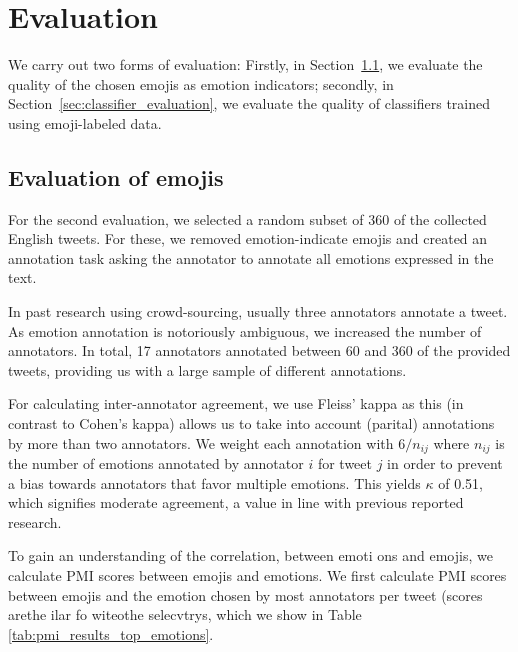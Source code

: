 \documentclass[10pt, a4paper]{article}
\begin{document}
\section{Evaluation}
\label{sec:evaluation}
We carry out two forms of evaluation: Firstly, 
in Section~\ref{sec:emoji_evaluation}, we evaluate the quality of the chosen emojis as emotion indicators; secondly, 
in Section~\ref{sec:classifier_evaluation}, we evaluate the quality of classifiers trained using emoji-labeled data.

\subsection{Evaluation of emojis}
\label{sec:emoji_evaluation}

For the second evaluation, we selected a random subset of 360 of the collected English tweets. For these, we removed emotion-indicate emojis and created an annotation task asking the annotator to annotate all emotions expressed in the text.

In past research using crowd-sourcing, usually three annotators annotate a tweet. As emotion annotation is notoriously ambiguous, we increased the number of annotators. In total, 17 annotators annotated between 60 and 360 of the provided tweets, providing us with a large sample of different annotations.

For calculating inter-annotator agreement, we use Fleiss' kappa as this (in contrast to Cohen's kappa) allows us to take into account (parital) annotations by more than two annotators. We weight each annotation with $ 6 / n_{ij}$ where $n_{ij}$ is the number of emotions annotated by annotator $i$ for tweet $j$ in order to prevent a bias towards annotators that favor multiple emotions. This yields $\kappa$ of 0.51, which signifies moderate agreement, a value in line with previous reported research.

To gain an understanding of the correlation, between emoti%
%
%
ons and emojis, we calculate PMI scores between emojis and emotions. We first calculate PMI scores between emojis and the emotion chosen by most annotators per tweet (scores arethe ilar fo witeothe selecvtrys, which we show in Table \ref{tab:pmi_results_top_emotions}.
\end{document}

